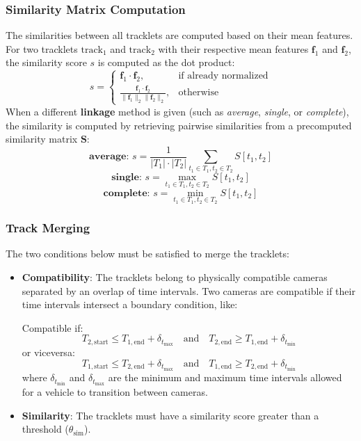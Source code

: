 \subsubsection{Similarity Matrix Computation}
The similarities between all tracklets are computed based on their mean features. For two tracklets $\text{track}_1$ and $\text{track}_2$ with their respective mean features $\mathbf{f}_1$ and $\mathbf{f}_2$, the similarity score $s$ is computed as the dot product:
\[
s = 
\begin{cases}
\mathbf{f}_1 \cdot \mathbf{f}_2, & \text{if already normalized} \\
\frac{\mathbf{f}_1 \cdot \mathbf{f}_2}{\|\mathbf{f}_1\|_2 \|\mathbf{f}_2\|_2}, & \text{otherwise}
\end{cases}
\]
When a different \textbf{linkage} method is given (such as \textit{average}, \textit{single}, or \textit{complete}), the similarity is computed by retrieving pairwise similarities from a precomputed similarity matrix \( \mathbf{S} \):
\[
    \textbf{average: } s = \frac{1}{|T_1| \cdot |T_2|} \sum_{t_1 \in T_1, t_2 \in T_2} S[t_1, t_2]
\]
\[
    \textbf{single: } s = \max_{t_1 \in T_1, t_2 \in T_2} S[t_1, t_2]
\]
\[
    \textbf{complete: } s = \min_{t_1 \in T_1, t_2 \in T_2} S[t_1, t_2]
\]

\subsubsection{Track Merging}
The two conditions below must be satisfied to merge the tracklets:
\begin{itemize}
    \item \textbf{Compatibility}: The tracklets belong to physically compatible cameras separated by an overlap of time intervals. Two cameras are compatible if their time intervals intersect a boundary condition, like:
    
    Compatible if:
    \[ T_{2, \text{start}} \leq T_{1, \text{end}} + \delta_{t_{\max}} \quad \text{and} \quad T_{2, \text{end}} \geq T_{1, \text{end}} + \delta_{t_{\min}} \]
    or viceversa:
    \[ T_{1, \text{start}} \leq T_{2, \text{end}} + \delta_{t_{\max}} \quad \text{and} \quad T_{1, \text{end}} \geq T_{2, \text{end}} + \delta_{t_{\min}} \]
    where \( \delta_{t_{\min}} \) and \( \delta_{t_{\max}} \) are the minimum and maximum time intervals allowed for a vehicle to transition between cameras.
    \item \textbf{Similarity}: The tracklets must have a similarity score greater than a threshold (\( \theta_{\text{sim}} \)).
\end{itemize}

